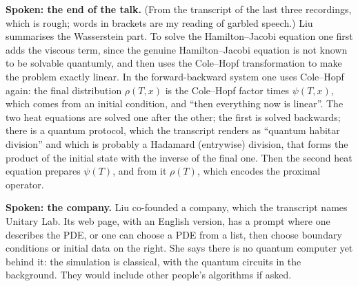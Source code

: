 \medskip\noindent
{\bf Spoken: the end of the talk.}
(From the transcript of the last three
recordings, which is rough; words in
brackets are my reading of garbled speech.)
Liu summarises the Wasserstein part. To
solve the Hamilton--Jacobi equation one first
adds the viscous term, since the genuine
Hamilton--Jacobi equation is not known to be
solvable quantumly, and then uses the
Cole--Hopf transformation to make the problem
exactly linear. In the forward-backward system
one uses Cole--Hopf again: the final
distribution $\rho(T,x)$ is the
Cole--Hopf factor times $\psi(T,x)$, which comes
from an initial condition, and ``then
everything now is linear''. The two heat
equations are solved one after the other; the
first is solved backwards; there is a
quantum protocol, which the transcript renders
as ``quantum habitar division'' and which
is probably a Hadamard (entrywise) division,
that forms the product of the initial state
with the inverse of the final one. Then the
second heat equation prepares
$\psi(T)$, and from it $\rho(T)$, which encodes
the proximal operator.

\medskip\noindent
{\bf Spoken: the company.}
Liu co-founded a company, which the transcript
names Unitary Lab. Its web page, with an
English version, has a prompt where one
describes the PDE, or one can choose a PDE
from a list, then choose boundary conditions
or initial data on the right. She says there
is no quantum computer yet behind it: the
simulation is classical, with the quantum
circuits in the background. They would
include other people's algorithms if asked.

